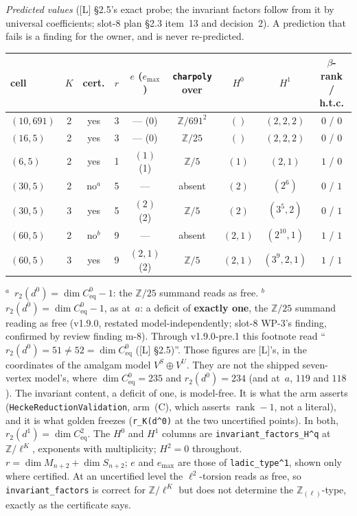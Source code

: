 \documentclass[11pt]{article}
\theoremstyle{remark}
\newcommand{\Z}{\mathbb{Z}}
\begin{document}
\emph{Predicted values} ([L] \S2.5's exact probe; the invariant factors follow from it by
universal coefficients; slot-8 plan \S2.3 item~13 and decision~2). A prediction that fails is a
finding for the owner, and is never re-predicted.
\begin{center}\small
\begin{tabular}{@{}lcccccccc@{}}
\toprule
cell & $K$ & cert. & $r$ & $e$ ($e_{\max}$) & \texttt{charpoly} over & $H^0$ & $H^1$ & $\beta$-rank / h.t.c. \\
\midrule
$(10,691)$ & 2 & yes & 3 & --- (0) & $\Z/691^2$ & $()$ & $(2,2,2)$ & $0$ / $0$ \\
$(16,5)$ & 2 & yes & 3 & --- (0) & $\Z/25$ & $()$ & $(2,2,2)$ & $0$ / $0$ \\
$(6,5)$ & 2 & yes & 1 & $(1)$ (1) & $\Z/5$ & $(1)$ & $(2,1)$ & $1$ / $0$ \\
$(30,5)$ & 2 & no$^{a}$ & 5 & --- & absent & $(2)$ & $(2^6)$ & $0$ / $1$ \\
$(30,5)$ & 3 & yes & 5 & $(2)$ (2) & $\Z/5$ & $(2)$ & $(3^5,2)$ & $0$ / $1$ \\
$(60,5)$ & 2 & no$^{b}$ & 9 & --- & absent & $(2,1)$ & $(2^{10},1)$ & $1$ / $1$ \\
$(60,5)$ & 3 & yes & 9 & $(2,1)$ (2) & $\Z/5$ & $(2,1)$ & $(3^9,2,1)$ & $1$ / $1$ \\
\bottomrule
\end{tabular}
\end{center}
\noindent$^{a}$~$r_2(d^0)=\dim C^0_{\mathrm{eq}}-1$: the $\Z/25$ summand reads as free.
$^{b}$~$r_2(d^0)=\dim C^0_{\mathrm{eq}}-1$, as at~$a$: a deficit of \textbf{exactly one}, the
$\Z/25$ summand reading as free (v1.9.0, restated model-independently; slot-8 WP-3's finding,
confirmed by review finding m-8). Through v1.9.0-pre.1 this footnote read
``$r_2(d^0)=51\ne52=\dim C^0_{\mathrm{eq}}$ ([L] \S2.5)''. Those figures are [L]'s, in the
coordinates of the amalgam model $V^S\oplus V^U$. They are not the shipped seven-vertex model's,
where $\dim C^0_{\mathrm{eq}}=235$ and $r_2(d^0)=234$ (and at~$a$, $119$ and $118$). The
invariant content, a deficit of one, is model-free. It is what the arm asserts
(\texttt{HeckeReductionValidation}, arm~(C), which asserts $\operatorname{rank}-1$, not a literal),
and it is what golden freezes (\texttt{r\_K(d\textasciicircum0)} at the two uncertified points). In both, $r_2(d^1)=\dim
C^2_{\mathrm{eq}}$. The $H^0$ and $H^1$ columns are
\texttt{invariant\_factors\_H\textasciicircum q} at $\Z/\ell^K$, exponents with multiplicity;
$H^2=0$ throughout. $r=\dim M_{n+2}+\dim S_{n+2}$; $e$ and $e_{\max}$ are those of
\texttt{ladic\_type\textasciicircum1}, shown only where certified. At an uncertified level the
$\ell^2$-torsion reads as free, so \texttt{invariant\_factors} is correct for $\Z/\ell^K$ but does
not determine the $\Z_{(\ell)}$-type, exactly as the certificate says.
\end{document}
